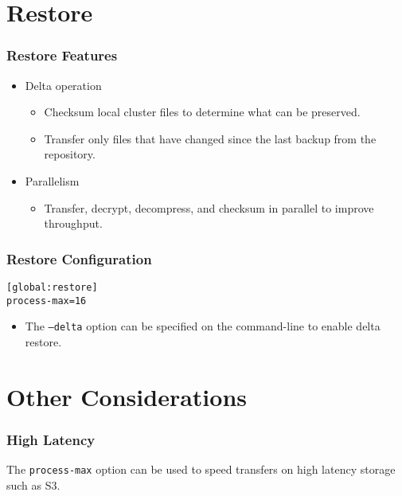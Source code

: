 \section{Restore}

\begin{frame}
    \frametitle{Restore Features}

    \begin{itemize}
        \item Delta operation

        \begin{itemize}
            \item Checksum local cluster files to determine what can be preserved.\pause
            \item Transfer only files that have changed since the last backup from the repository.\pause
        \end{itemize}

        \item Parallelism

        \begin{itemize}
            \item Transfer, decrypt, decompress, and checksum in parallel to improve throughput.
        \end{itemize}
    \end{itemize}
\end{frame}

\begin{frame}[fragile]
    \frametitle{Restore Configuration}

    \vspace{.75em}\begin{lstlisting}[title=pgbackrest.conf]
[global:restore]
process-max=16
    \end{lstlisting}\pause\vspace{1em}

    \begin{itemize}
        \item The \texttt{--delta} option can be specified on the command-line to enable delta restore.
    \end{itemize}
\end{frame}

\section{Other Considerations}

\begin{frame}
    \frametitle{High Latency}

    The \texttt{process-max} option can be used to speed transfers on high latency storage such as S3.
\end{frame}

